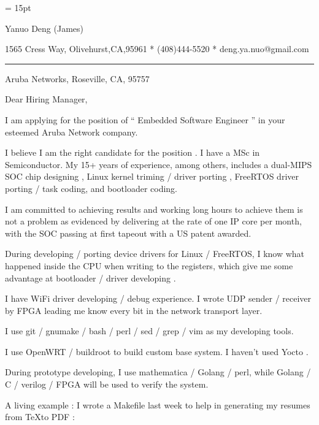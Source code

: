 

  \FFrg \baselineskip = 15pt

{
Yanuo Deng (James)
}

{ 
1565 Cress Way, Olivehurst,CA,95961
*
(408)444-5520
*
deng.ya.nuo@gmail.com
}

{ \smallbreak } 

{\par\noindent\hrule} 

{ \bigbreak } 


Aruba Networks, Roseville, CA, 95757

{ 
Dear Hiring Manager,
}

{ \bigbreak } 
I am applying for the position of `` Embedded Software Engineer '' in your esteemed Aruba Network company.

{ \bigbreak } 
I believe I am the right candidate for the position .
I have a MSc in Semiconductor.
My 15+ years of experience, among others, 
includes a dual-MIPS SOC chip designing ,
Linux kernel triming  /  driver porting , 
FreeRTOS driver porting  /  task coding,
and bootloader coding.

{ \bigbreak } 
I am committed to achieving results and working long hours 
to achieve them is not a problem as evidenced by 
delivering at the rate of one IP core per month,
with the SOC passing at first tapeout
with a US patent awarded.

{ \bigbreak } 
During developing  /  porting device drivers for Linux / FreeRTOS,
I know what happened inside the CPU when writing to the registers,
which give me some advantage at bootloader  /  driver developing .

{ \bigbreak } 
I have WiFi driver developing / debug experience. 
I wrote UDP sender / receiver by FPGA leading me know every bit in the network transport layer.

{ \bigbreak } 
I use git  /  gnumake  /  bash  /  perl  /  sed  /  grep  /  vim as my developing tools.

{ \bigbreak } 
I use OpenWRT / buildroot to build custom base system. I haven't used Yocto .

{ \bigbreak } 
During prototype developing, I use mathematica / Golang / perl, 
while Golang / C / verilog / FPGA will be used to verify the system.

{ \bigbreak } 
A living example : I wrote a Makefile last week to help in generating my resumes from \TeX to PDF : 

